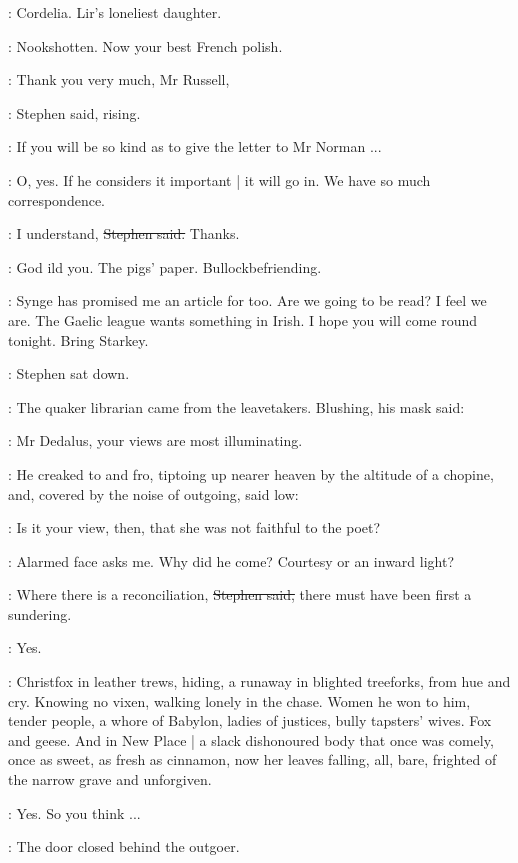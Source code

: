 \StephenInt:
Cordelia.
Lir's loneliest daughter.

\StephenInt:
Nookshotten.
Now your best French polish.

\Stephen:
Thank you very much,
Mr Russell,

:
Stephen said, rising.

\Stephen:
If you will be so kind as to give the letter to Mr Norman ...

\AErussell:
O, yes.
If he considers it important |
it will go in.
We have so much correspondence.

\Stephen:
I understand,
\sout{Stephen said.}
Thanks.

\StephenInt:
God ild you.
The pigs' paper.
Bullockbefriending.

\AErussell:
Synge has promised me an article for  too.
Are we going to be read?
I feel we are.
The Gaelic league wants something in Irish.
I hope you will come round tonight.
Bring Starkey.

:
Stephen sat down.

:
The quaker librarian came from the leavetakers.
Blushing,
his mask said:

\librarian:
Mr Dedalus,
your views are most illuminating.

:
He creaked to and fro,
tiptoing up nearer heaven by the altitude of a chopine,
and,
covered by the noise of outgoing,
said low:

\librarian:
Is it your view,
then,
that she was not faithful to the poet?

\StephenInt:
Alarmed face asks me.
Why did he come?
Courtesy or an inward light?

\Stephen:
Where there is a reconciliation,
\sout{Stephen said,}
there must have been first a sundering.

\librarian:
Yes.

\StephenInt:
Christfox in leather trews,
hiding,
a runaway in blighted tree\-forks,
from hue and cry.
Knowing no vixen,
walking lonely in the chase.
Women he won to him,
tender people,
a whore of Babylon,
ladies of justices,
bully tapsters' wives.
Fox and geese.
And in New Place |
a slack dishonoured body that once was comely,
once as sweet,
as fresh as cinnamon,
now her leaves falling,
all, bare,
frighted of the narrow grave
and unforgiven.

\librarian:
Yes.
So you think ...

:
The door closed behind the outgoer.

